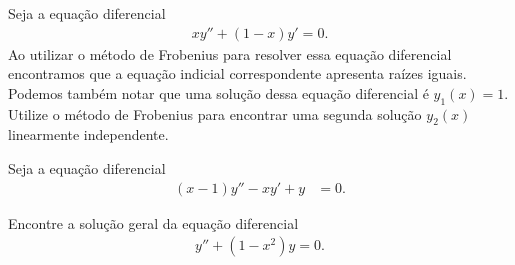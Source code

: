 \documentclass[a4paper,12pt, leqno, answers]{exam}
\begin{document}
\begin{questions}
    \question[P1 de 2006] Seja a equa\c{c}\~{a}o diferencial
    \begin{align*}
        x y'' + (1 - x) y' = 0.
    \end{align*}
    Ao utilizar o m\'{e}todo de Frobenius para resolver essa equa\c{c}\~{a}o diferencial encontramos que a equa\c{c}\~{a}o indicial correspondente apresenta ra\'{i}zes iguais. Podemos tamb\'{e}m notar que uma solu\c{c}\~{a}o dessa equa\c{c}\~{a}o diferencial \'{e} $y_1(x) = 1$. Utilize o m\'{e}todo de Frobenius para encontrar uma segunda solu\c{c}\~{a}o $y_2(x)$ linearmente independente.
    \begin{solution}
    \end{solution}

    \question[P1 de 2006] Seja a equa\c{c}\~{a}o diferencial
    \begin{align*}
        (x - 1) y'' - x y' + y &= 0.
    \end{align*}

    \question[E 2006] Encontre a solu\c{c}\~{a}o geral da equa\c{c}\~{a}o diferencial
    \begin{align*}
        y'' + (1 - x^2) y = 0.
    \end{align*}
    \begin{solution}
    \end{solution}


\end{questions}
\end{document}
